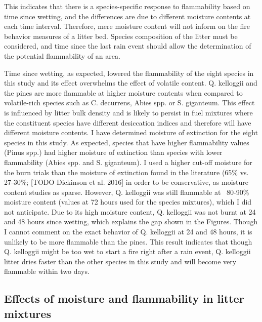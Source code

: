 \documentclass[fire,article,submit,moreauthors,pdftex]{Definitions/mdpi}
\begin{document}
This indicates that there is a species-specific response to flammability based on time since wetting, and the differences are due to different moisture contents at each time interval. Therefore, mere moisture content will not inform on the fire behavior measures of a litter bed. Species composition of the litter must be considered, and time since the last rain event should allow the determination of the potential flammability of an area. 

Time since wetting, as expected, lowered the flammability of the eight species in this study and its effect overwhelms the effect of volatile content. Q. kelloggii and the pines are more flammable at higher moisture contents when compared to volatile-rich species such as C. decurrens, Abies spp. or S. giganteum. This effect is influenced by litter bulk density and is likely to persist in fuel mixtures where the constituent species have different desiccation indices and therefore will have different moisture contents. I have determined moisture of extinction for the eight species in this study. As expected, species that have higher flammability values (Pinus spp.) had higher moisture of extinction than species with lower flammability (Abies spp. and S. giganteum). I used a higher cut-off moisture for the burn trials than the moisture of extinction found in the literature (65\% vs. 27-30\%; \citep{ Rothermel-1972} [TODO Dickinson et al. 2016] in order to be conservative, as moisture content studies as sparse. However, Q. kelloggii was still flammable at ~80-90\% moisture content (values at 72 hours used for the species mixtures), which I did not anticipate. Due to its high moisture content, Q. kelloggii was not burnt at 24 and 48 hours since wetting, which explains the gap shown in the Figures. Though I cannot comment on the exact behavior of Q. kelloggii at 24 and 48 hours, it is unlikely to be more flammable than the pines. This result indicates that though Q. kelloggii might be too wet to start a fire right after a rain event, Q. kelloggii litter dries faster than the other species in this study and will become very flammable within two days.

\subsection{Effects of moisture and flammability in litter mixtures}
\end{document}
